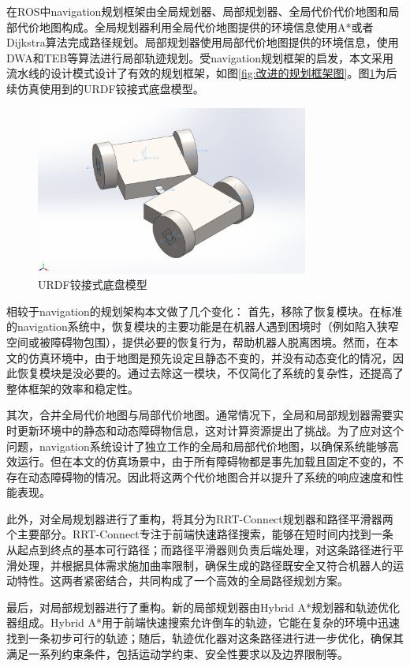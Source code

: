 \documentclass[master,academic]{ysuthesis} %
\begin{document}
	在ROS中navigation规划框架由全局规划器、局部规划器、全局代价代价地图和局部代价地图构成。全局规划器利用全局代价地图提供的环境信息使用A*或者Dijkstra算法完成路径规划。局部规划器使用局部代价地图提供的环境信息，使用DWA和TEB等算法进行局部轨迹规划。受navigation规划框架的启发，本文采用流水线的设计模式设计了有效的规划框架，如图\ref{fig:改进的规划框架图}。图\ref{fig:URDF铰接式底盘模型}为后续仿真使用到的URDF铰接式底盘模型。
	\begin{figure}[H]
		\centering
		\includegraphics[width=0.8\textwidth]{urdf.png}
		\caption{URDF铰接式底盘模型}
		\label{fig:URDF铰接式底盘模型}
	\end{figure}
	
	相较于navigation的规划架构本文做了几个变化：
	首先，移除了恢复模块。在标准的navigation系统中，恢复模块的主要功能是在机器人遇到困境时（例如陷入狭窄空间或被障碍物包围），提供必要的恢复行为，帮助机器人脱离困境。然而，在本文的仿真环境中，由于地图是预先设定且静态不变的，并没有动态变化的情况，因此恢复模块是没必要的。通过去除这一模块，不仅简化了系统的复杂性，还提高了整体框架的效率和稳定性。

	其次，合并全局代价地图与局部代价地图。通常情况下，全局和局部规划器需要实时更新环境中的静态和动态障碍物信息，这对计算资源提出了挑战。为了应对这个问题，navigation系统设计了独立工作的全局和局部代价地图，以确保系统能够高效运行。但在本文的仿真场景中，由于所有障碍物都是事先加载且固定不变的，不存在动态障碍物的情况。因此将这两个代价地图合并以提升了系统的响应速度和性能表现。

	此外，对全局规划器进行了重构，将其分为RRT-Connect规划器和路径平滑器两个主要部分。RRT-Connect专注于前端快速路径搜索，能够在短时间内找到一条从起点到终点的基本可行路径；而路径平滑器则负责后端处理，对这条路径进行平滑处理，并根据具体需求施加曲率限制，确保生成的路径既安全又符合机器人的运动特性。这两者紧密结合，共同构成了一个高效的全局路径规划方案。

	最后，对局部规划器进行了重构。新的局部规划器由Hybrid A*规划器和轨迹优化器组成。Hybrid A*用于前端快速搜索允许倒车的轨迹，它能在复杂的环境中迅速找到一条初步可行的轨迹；随后，轨迹优化器对这条路径进行进一步优化，确保其满足一系列约束条件，包括运动学约束、安全性要求以及边界限制等。
	
\end{document}
